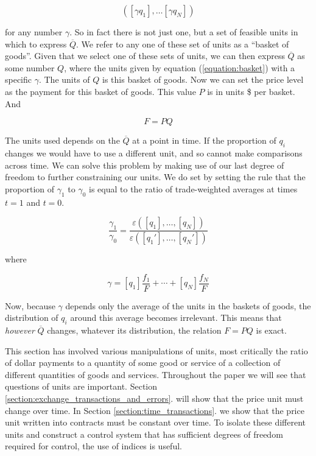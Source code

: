 \begin{equation}\label{equation:basket}
    \left( \left[ \gamma q_1 \right], \dots \left[ \gamma q_N \right] \right)
\end{equation}

for any number $\gamma$. So in fact there is not just one, but a set of feasible units in which to
express $\overline Q$. We refer to any one of these set of units as a ``basket of goods''. Given
that we select one of these sets of units, we can then express $\overline Q$ as some number $Q$,
where the units given by equation (\ref{equation:basket}) with a specific $\gamma$. The units of
$Q$ is this basket of goods. Now we can set the price level as the payment for this basket of goods.
This value $P$ is in units \$ per basket. And

\begin{equation} \label{eq:fpq}
   F = PQ
\end{equation}

The units used depends on the $\overline Q$ at a point in time. If the proportion of $q_i$ changes
we would have to use a different unit, and so cannot make comparisons across time. We can solve this
problem by making use of our last degree of freedom to further constraining our units. We do set by
setting the rule that the proportion of $\gamma_1$ to $\gamma_0$ is equal to the ratio of
trade-weighted averages at times $t=1$ and $t=0$. 

\begin{equation}
    \frac {\gamma_1} {\gamma_0} = \frac {\varepsilon \left( \left[ q_1 \right], \dots, \left[ q_N \right] \right)}
    {\varepsilon \left( \left[ {q_1}' \right], \dots, \left[ {q_N}' \right] \right)}
\end{equation}

where

\[ \gamma = [q_1] \frac {f_1} F + \cdots + [q_N] \frac {f_N} F \]

Now, because $\gamma$ depends only the average of the units in the baskets of goods, the distribution of
$q_i$ around this average becomes irrelevant. This means that \textit{however} $\overline Q$
changes, whatever its distribution, the relation $F=PQ$ is exact.  

This section has involved various manipulations of units, most critically the ratio of dollar
payments to a quantity of some good or service of a collection of different quantities of goods and
services. Throughout the paper we will see that questions of units are important. Section
\ref{section:exchange_transactions_and_errors}. will show that the price unit must change over
time. In Section \ref{section:time_transactions}. we show that the price unit written into
contracts must be constant over time. To isolate these different units and construct a control
system that has sufficient degrees of freedom required for control, the use of indices is useful.

